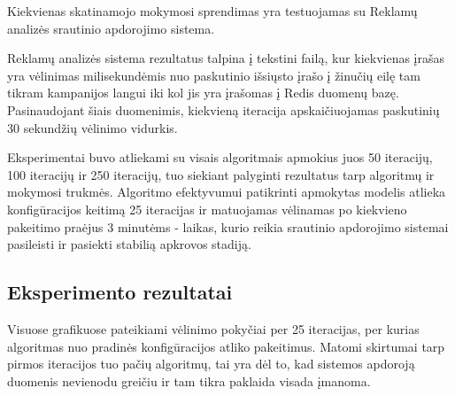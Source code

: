 \documentclass{VUMIFPSbakalaurinis}
\begin{document}
Kiekvienas skatinamojo mokymosi sprendimas yra testuojamas su Reklamų analizės srautinio apdorojimo sistema.

Reklamų analizės sistema rezultatus talpina į tekstini failą, kur kiekvienas įrašas yra vėlinimas milisekundėmis nuo paskutinio išsiųsto įrašo į žinučių eilę tam tikram kampanijos langui iki kol jis yra įrašomas į Redis duomenų bazę. Pasinaudojant šiais duomenimis, kiekvieną iteracija apskaičiuojamas paskutinių 30 sekundžių vėlinimo vidurkis. 

Eksperimentai buvo atliekami su visais algoritmais apmokius juos 50 iteracijų, 100 iteracijų ir 250 iteracijų, tuo siekiant palyginti rezultatus tarp algoritmų ir mokymosi trukmės. Algoritmo efektyvumui patikrinti apmokytas modelis atlieka konfigūracijos keitimą 25 iteracijas ir matuojamas vėlinamas po kiekvieno pakeitimo praėjus 3 minutėms - laikas, kurio reikia srautinio apdorojimo sistemai pasileisti ir pasiekti stabilią apkrovos stadiją.

\subsection{Eksperimento rezultatai}

Visuose grafikuose pateikiami vėlinimo pokyčiai per 25 iteracijas, per kurias algoritmas nuo pradinės konfigūracijos atliko pakeitimus. Matomi skirtumai tarp pirmos iteracijos tuo pačių algoritmų, tai yra dėl to, kad sistemos apdoroją duomenis nevienodu greičiu ir tam tikra paklaida visada įmanoma.
\end{document}
